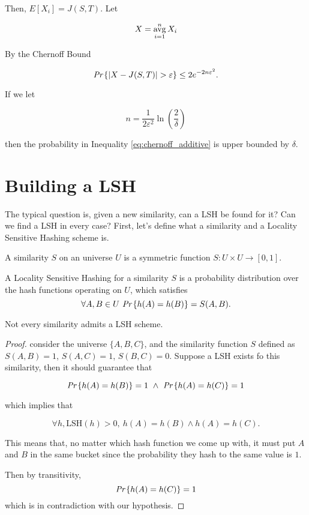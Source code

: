 Then, $E[X_i] = J(S, T)$. Let

\begin{equation}
X = \operatorname*{avg}_{i = 1}^n{X_i}
\end{equation}

By the Chernoff Bound

\begin{equation}
\emph{Pr}\left\{ | X - J(S, T)| > \varepsilon\right\} \leq 2e^{-2n\varepsilon^2}.
\end{equation}

If we let 

\begin{equation}
 n = \frac{1}{2\varepsilon^2}\ln\left(\frac{2}{\delta}\right)
\end{equation}

then the probability in Inequality \ref{eq:chernoff_additive} is upper bounded by $\delta$.

\section{Building a LSH}

The typical question is, given a new similarity, can a LSH be found for it? Can we find a LSH in every case? First, let's define what a similarity and a Locality Sensitive Hashing scheme is.

\begin{defn}[Similarity]
	A similarity $S$ on an universe $U$ is a symmetric function $S: U\times U \rightarrow [0, 1]$.
\end{defn}

\begin{defn}
	A Locality Sensitive Hashing for a similarity $S$ is a probability distribution over the hash functions operating on $U$, which satisfies
	\begin{equation}
		\forall A, B \in U\ \pr{h(A) = h(B)} = S(A, B).
	\end{equation}
\end{defn}
\begin{obs}
	Not every similarity admits a LSH scheme.
\end{obs}
\begin{proof}
consider the universe $\{A, B, C\}$, and the similarity function $S$ defined as $S(A, B) = 1$, $S(A, C) = 1$, $S(B, C) = 0$. Suppose a LSH exists fo this similarity, then it should guarantee that

$$\emph{Pr}\left\{h(A) = h(B)\right\} = 1\ \wedge\ \emph{Pr}\left\{h(A) = h(C)\right\} = 1$$


which implies that

$$\forall h, \text{LSH}(h) > 0,\ h(A) = h(B) \wedge  h(A) = h(C).$$

This means that, no matter which hash function we come up with, it must put $A$ and $B$ in the same bucket since the probability they hash to the same value is $1$. 

Then by transitivity, $$\emph{Pr}\left\{h(A) = h(C)\right\} = 1$$ which is in contradiction with our hypothesis.
\end{proof}

